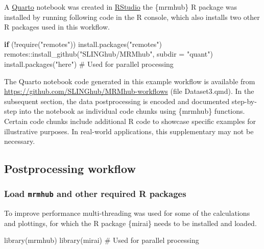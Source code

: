 \documentclass[
  letterpaper,
  DIV=11,
  numbers=noendperiod]{scrartcl}
\newenvironment{Shaded}{\begin{snugshade}}{\end{snugshade}}
\newcommand{\AttributeTok}[1]{\textcolor[rgb]{0.40,0.45,0.13}{#1}}
\newcommand{\CommentTok}[1]{\textcolor[rgb]{0.37,0.37,0.37}{#1}}
\newcommand{\ControlFlowTok}[1]{\textcolor[rgb]{0.00,0.23,0.31}{\textbf{#1}}}
\newcommand{\FunctionTok}[1]{\textcolor[rgb]{0.28,0.35,0.67}{#1}}
\newcommand{\NormalTok}[1]{\textcolor[rgb]{0.00,0.23,0.31}{#1}}
\newcommand{\SpecialCharTok}[1]{\textcolor[rgb]{0.37,0.37,0.37}{#1}}
\newcommand{\StringTok}[1]{\textcolor[rgb]{0.13,0.47,0.30}{#1}}
\begin{document}
A \href{https://quarto.org/}{Quarto} notebook was created in
\href{https://posit.co/download/rstudio-desktop/}{RStudio} the
\{mrmhub\} R package was installed by running following code in the R
console, which also installs two other R packages used in this workflow.

\begin{Shaded}
\begin{Highlighting}[]
\ControlFlowTok{if}\NormalTok{ (}\SpecialCharTok{!}\FunctionTok{require}\NormalTok{(}\StringTok{"remotes"}\NormalTok{)) }\FunctionTok{install.packages}\NormalTok{(}\StringTok{"remotes"}\NormalTok{)}
\NormalTok{remotes}\SpecialCharTok{::}\FunctionTok{install\_github}\NormalTok{(}\StringTok{"SLINGhub/MRMhub"}\NormalTok{, }\AttributeTok{subdir =} \StringTok{"quant"}\NormalTok{)}
\FunctionTok{install.packages}\NormalTok{(}\StringTok{"here"}\NormalTok{) }\CommentTok{\# Used for parallel processing}
\end{Highlighting}
\end{Shaded}

The Quarto notebook code generated in this example workflow is available
from \url{https://github.com/SLINGhub/MRMhub-workflows} (file
Dataset3.qmd). In the subsequent section, the data postprocessing is
encoded and documented step-by-step into the notebook as individual code
chunks using \{mrmhub\} functions. Certain code chunks include
additional R code to showcase specific examples for illustrative
purposes. In real-world applications, this supplementary may not be
necessary.

\subsection{Postprocessing workflow}\label{postprocessing-workflow}

\subsubsection{\texorpdfstring{Load \texttt{mrmhub} and other required R
packages}{Load mrmhub and other required R packages}}\label{load-mrmhub-and-other-required-r-packages}

To improve performance multi-threading was used for some of the
calculations and plottings, for which the R package \{mirai\} needs to
be installed and loaded.

\begin{Shaded}
\begin{Highlighting}[]
\FunctionTok{library}\NormalTok{(mrmhub)}
\FunctionTok{library}\NormalTok{(mirai)  }\CommentTok{\# Used for parallel processing}
\end{Highlighting}
\end{Shaded}
\end{document}
